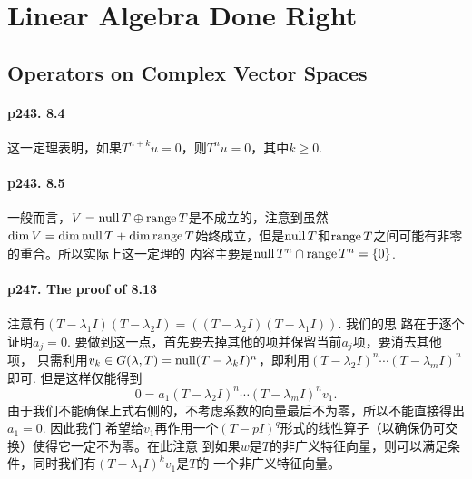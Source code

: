 \section{Linear Algebra Done Right}

\setcounter{subsection}{7}
\subsection{Operators on Complex Vector Spaces}
  \paragraph{p243. 8.4}
    这一定理表明，如果$T^{n+k}u=0$，则$T^nu=0$，其中$k\ge 0$.

  \paragraph{p243. 8.5}
    一般而言，$V=\operatorname{null} T\oplus\operatorname{range} T$是不成立的，注意到虽然$\dim V=\dim\operatorname{null} T+\dim
    \operatorname{range} T$始终成立，但是$\operatorname{null} T$和$\operatorname{range} T$之间可能有非零的重合。所以实际上这一定理的
    内容主要是$\operatorname{null} T^n\cap \operatorname{range} T^n = \{0\}$.

  \paragraph{p247. The proof of 8.13}
    注意有$(T-\lambda_1I)(T-\lambda_2I)=((T-\lambda_2I)(T-\lambda_1I))$. 我们的思
    路在于逐个证明$a_j=0$. 要做到这一点，首先要去掉其他的项并保留当前$a_j$项，要消去其他项，
    只需利用$v_k\in G(\lambda, T)=\operatorname{null}(T-\lambda_kI)^n$，即利用$(T-\lambda_2I)^n
    \cdots(T-\lambda_mI)^n$即可. 但是这样仅能得到
    \[
      0 = a_1(T-\lambda_2I)^n\cdots(T-\lambda_mI)^nv_1.
    \]
    由于我们不能确保上式右侧的，不考虑系数的向量最后不为零，所以不能直接得出$a_1=0$. 因此我们
    希望给$v_1$再作用一个$(T-pI)^q$形式的线性算子（以确保仍可交换）使得它一定不为零。在此注意
    到如果$w$是$T$的非广义特征向量，则可以满足条件，同时我们有$(T-\lambda_1I)^kv_1$是$T$的
    一个非广义特征向量。

